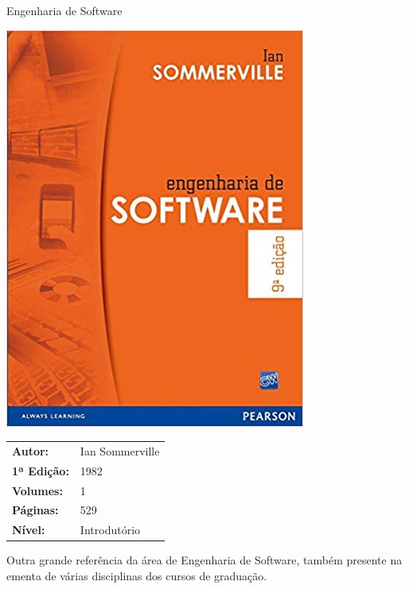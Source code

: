 \begin{frame}[fragile]{Engenharia de Software}

    \begin{minipage}{0.4\textwidth}
        \includegraphics[scale=0.25]{sommerville.jpg}
    \end{minipage}
    \begin{minipage}{0.5\textwidth}
        \begin{small}
            \begin{tabularx}{0.95\textwidth}{lX}
                \textbf{Autor:} & Ian Sommerville \\
                \textbf{1ª Edição:} & 1982 \\
                \textbf{Volumes:} & 1 \\
                \textbf{Páginas:} & 529 \\
                \textbf{Nível:} & Introdutório \\
            \end{tabularx}
        \end{small}
    \end{minipage}

    \vspace{0.2in} 

    Outra grande referência da área de Engenharia de Software, também presente na ementa de
    várias disciplinas dos cursos de graduação.

\end{frame}

